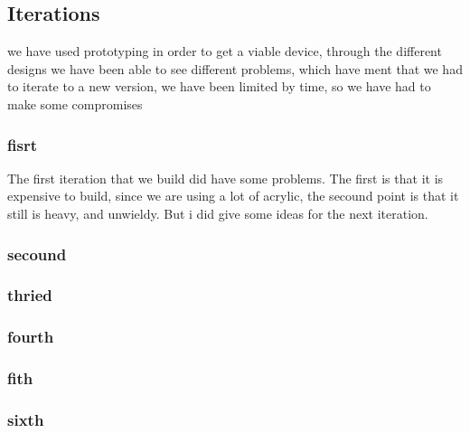 \subsection{Iterations}
we have used prototyping in order to get a viable device, through the different designs we have been able to see different problems, which have ment that we had to iterate to a new version, we have been limited by time, so we have had to make some compromises

\subsubsection{fisrt}
The first iteration that we build did have some problems.
The first is that it is expensive to build, since we are using a lot of acrylic, the secound point is that it still is heavy, and unwieldy.
But i did give some ideas for the next iteration.

\subsubsection{secound}


\subsubsection{thried}


\subsubsection{fourth}


\subsubsection{fith}

\subsubsection{sixth}

